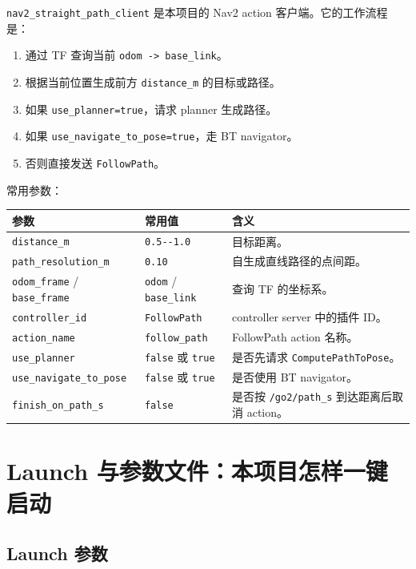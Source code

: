 \documentclass[UTF8,11pt,a4paper,openany]{ctexrep}
\newcommand{\code}[1]{\nolinkurl{#1}}
\newcommand{\topic}[1]{\nolinkurl{#1}}
\newcommand{\rosnode}[1]{\nolinkurl{#1}}
\newcommand{\param}[1]{\nolinkurl{#1}}
\newcommand{\actionname}[1]{\nolinkurl{#1}}
\begin{document}
\rosnode{nav2_straight_path_client} 是本项目的 Nav2 action 客户端。它的工作流程是：

\begin{enumerate}
  \item 通过 TF 查询当前 \code{odom -> base_link}。
  \item 根据当前位置生成前方 \param{distance_m} 的目标或路径。
  \item 如果 \param{use_planner=true}，请求 planner 生成路径。
  \item 如果 \param{use_navigate_to_pose=true}，走 BT navigator。
  \item 否则直接发送 \actionname{FollowPath}。
\end{enumerate}

常用参数：

\begin{longtable}{L{0.27\textwidth} L{0.20\textwidth} L{0.43\textwidth}}
\toprule
\textbf{参数} & \textbf{常用值} & \textbf{含义} \\
\midrule
\endhead
\param{distance_m} & \code{0.5--1.0} & 目标距离。\\
\param{path_resolution_m} & \code{0.10} & 自生成直线路径的点间距。\\
\param{odom_frame} / \param{base_frame} & \code{odom} / \code{base_link} & 查询 TF 的坐标系。\\
\param{controller_id} & \code{FollowPath} & controller server 中的插件 ID。\\
\param{action_name} & \code{follow_path} & FollowPath action 名称。\\
\param{use_planner} & \code{false} 或 \code{true} & 是否先请求 \actionname{ComputePathToPose}。\\
\param{use_navigate_to_pose} & \code{false} 或 \code{true} & 是否使用 BT navigator。\\
\param{finish_on_path_s} & \code{false} & 是否按 \topic{/go2/path_s} 到达距离后取消 action。\\
\bottomrule
\end{longtable}

\chapter{Launch 与参数文件：本项目怎样一键启动}

\section{Launch 参数}
\end{document}
